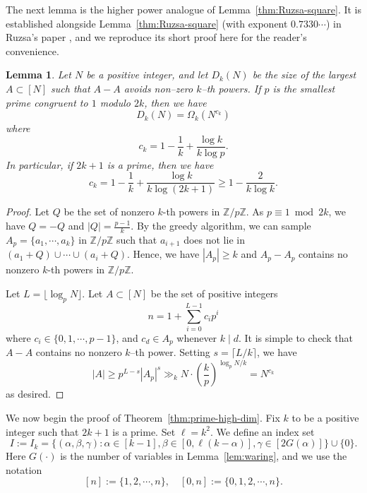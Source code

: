\documentclass[12pt,reqno]{amsart}
\theoremstyle{plain}
\newtheorem{lemma}[theorem]{Lemma}
\theoremstyle{definition}
\newcommand{\Z}{\mathbb{Z}}
\newcommand{\1}{\mathbf{1}}
\begin{document}
The next lemma is the higher power analogue of Lemma~\ref{thm:Ruzsa-square}. It is established alongside Lemma~\ref{thm:Ruzsa-square} (with exponent $0.7330\cdots$) in Ruzsa's paper \cite{Ruzsa}, and we reproduce its short proof here for the reader's convenience.
\begin{lemma}
    \label{lem:$k$--th--power--difference--free}
    Let $N$ be a positive integer, and let $D_k(N)$ be the size of the largest $A \subset [N]$ such that $A - A$ avoids non--zero $k$--th powers. If $p$ is the smallest prime congruent to $1$ modulo $2k$, then we have
    $$D_k(N) = \Omega_k\left(N^{c_k}\right)$$
    where
    $$c_k = 1 - \frac{1}{k} + \frac{\log k}{k \log p}.$$
    In particular, if $2k + 1$ is a prime, then we have
    $$c_k = 1 - \frac{1}{k} + \frac{\log k}{k \log (2k + 1)} \geq 1 - \frac{2}{k \log k}.$$
\end{lemma}
\begin{proof}
    Let $Q$ be the set of nonzero $k$-th powers in  $\Z / p\Z$. As $p \equiv 1 \bmod{2k}$, we have $Q = -Q$ and $|Q| = \frac{p - 1}{k}$. By the greedy algorithm, we can sample $A_p = \{a_1, \cdots, a_k\}$ in $\Z / p\Z$ such that $a_{i + 1}$ does not lie in $(a_1 + Q) \cup \cdots \cup (a_i + Q)$. Hence, we have $|A_p| \geq k$ and $A_p - A_p$ contains no nonzero $k$-th powers in  $\Z / p\Z$.
    
    Let $L = \lfloor{\log_{p} N \rfloor}$. Let $A\subset [N]$ be the set of positive integers $$n=1 + \sum_{i=0}^{L - 1} c_i p^i$$
    where $c_i \in \{0, 1, \cdots, p - 1\}$, and $c_d\in A_p$ whenever $k\mid d$. It is simple to check that $A - A$ contains no nonzero $k$--th power. Setting $s = \lceil L / k \rceil$, we have
    $$|A| \geq p^{L - s} |A_p|^s \gg_k N \cdot \left(\frac{k}{p}\right)^{\log_p N / k} = N^{c_k}$$
    as desired.
\end{proof}
We now begin the proof of Theorem~\ref{thm:prime-high-dim}. Fix $k$ to be a positive integer such that $2k + 1$ is a prime. Set $\ell = k^2$. We define an index set
$$I := I_k = \{(\alpha, \beta, \gamma): \alpha \in [k - 1], \beta \in [0, \ell (k - \alpha)], \gamma \in [2G(\alpha)]\} \cup \{0\}.$$
Here $G(\cdot)$ is the number of variables in Lemma~\ref{lem:waring}, and we use the notation
$$[n] := \{1,2,\cdots, n\}, \quad [0, n] := \{0,1,2,\cdots, n\}.$$
\end{document}

